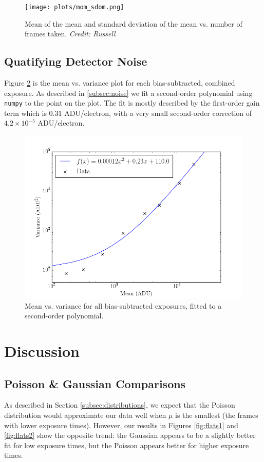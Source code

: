 \documentclass[preprint]{aastex62}
\begin{document}
\begin{figure}[H]
\begin{center}
\texttt{[image: plots/mom\_sdom.png]}
\caption{Mean of the mean and standard deviation of the mean vs. number of frames taken. \textit{Credit: Russell}} \label{fig:mom_sdom}
\end{center}
\end{figure}

\subsection{Quatifying Detector Noise} \label{subsec:gain}
Figure \ref{fig:mean_var} is the mean vs. variance plot for each bias-subtracted, combined exposure. As described in \ref{subsec:noise} we fit a second-order polynomial using {\tt numpy} to the point on the plot. The fit is mostly described by the first-order gain term which is 0.31 ADU/electron, with a very small second-order correction of $4.2\times10^{-5}$ ADU/electron.

\begin{figure}[H]
\begin{center}
\includegraphics[width=.48\linewidth]{plots/mean_vs_variance.png}
\caption{Mean vs. variance for all bias-subtracted exposures, fitted to a second-order polynomial.} \label{fig:mean_var}
\end{center}
\end{figure}

\section{Discussion}
\subsection{Poisson \& Gaussian Comparisons} \label{subsec:dist_comparisons}
As described in Section \ref{subsec:distributions}, we expect that the Poisson distribution would approximate our data well when $\mu$ is the smallest (the frames with lower exposure times). However, our results in Figures \ref{fig:flats1} and \ref{fig:flats2} show the opposite trend: the Gaussian appears to be a slightly better fit for low exposure times, but the Poisson appears better for higher exposure times.
\end{document}
